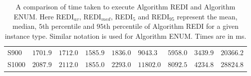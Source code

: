 \begin{table}[]
{\begin{tabular}{ R{1.2cm} | R{1.4cm} R{1.4cm} R{1.4cm} R{1.4cm} | R{1.4cm} R{1.6cm} R{1.4cm} R{1.4cm} }
 S900 & $1701.9$ & $1712.0$ & $1585.9$ & $1836.0$ & $9043.3$ & $5958.0$ & $3439.9$ & $20366.2$ \\ 
 S1000 & $2087.9$ & $2112.0$ & $1855.0$ & $2293.0$ & $11802.0$ & $8092.5$ & $4234.8$ & $28824.8$ \\ 
 \hline\hline \end{tabular}} \caption{A comparison of time taken to execute Algorithm REDI              and Algorithm ENUM. Here REDI$_{av}$, REDI$_{med}$, REDI$_{5}$ and REDI$_{95}$ represent the mean,              median, $5$th percentile and $95$th percentile of Algorithm REDI for a given instance type.              Similar notation is used for Algorithm ENUM. Times are in ms.} \label{sm_re_table_duration} \end{table} 